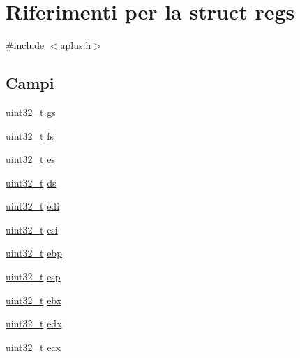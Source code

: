 \hypertarget{structregs}{\section{Riferimenti per la struct regs}
\label{structregs}
}


{\ttfamily \#include $<$aplus.\+h$>$}

\subsection*{Campi}
\begin{DoxyCompactItemize}
\item 
\hyperlink{aplus_8h_a53a0df51603c77c2aa5b9ea61b606a82}{uint32\+\_\+t} \hyperlink{structregs_a0fd3992a1d7ba82600e1e03bf5466ce8}{gs}
\item 
\hyperlink{aplus_8h_a53a0df51603c77c2aa5b9ea61b606a82}{uint32\+\_\+t} \hyperlink{structregs_a0974815767aa327833ce6beac16858d5}{fs}
\item 
\hyperlink{aplus_8h_a53a0df51603c77c2aa5b9ea61b606a82}{uint32\+\_\+t} \hyperlink{structregs_aede6adc8400a3e68071ad7a038fbbcc9}{es}
\item 
\hyperlink{aplus_8h_a53a0df51603c77c2aa5b9ea61b606a82}{uint32\+\_\+t} \hyperlink{structregs_aa29daa3553339a188913853a1d91e30a}{ds}
\item 
\hyperlink{aplus_8h_a53a0df51603c77c2aa5b9ea61b606a82}{uint32\+\_\+t} \hyperlink{structregs_a2b436d52440963797508f228cd45c207}{edi}
\item 
\hyperlink{aplus_8h_a53a0df51603c77c2aa5b9ea61b606a82}{uint32\+\_\+t} \hyperlink{structregs_a88723011f6b017490ee8bc7fc9a3235c}{esi}
\item 
\hyperlink{aplus_8h_a53a0df51603c77c2aa5b9ea61b606a82}{uint32\+\_\+t} \hyperlink{structregs_a1b38213d82714658dfd95ba5427f7f7b}{ebp}
\item 
\hyperlink{aplus_8h_a53a0df51603c77c2aa5b9ea61b606a82}{uint32\+\_\+t} \hyperlink{structregs_a7c44c0dc13f854e06e6cc509ba6e9054}{esp}
\item 
\hyperlink{aplus_8h_a53a0df51603c77c2aa5b9ea61b606a82}{uint32\+\_\+t} \hyperlink{structregs_a41a7a63387c4bb590af33d8ee3cb5a42}{ebx}
\item 
\hyperlink{aplus_8h_a53a0df51603c77c2aa5b9ea61b606a82}{uint32\+\_\+t} \hyperlink{structregs_a63133abf1974301855fe69ef4ee70ef3}{edx}
\item 
\hyperlink{aplus_8h_a53a0df51603c77c2aa5b9ea61b606a82}{uint32\+\_\+t} \hyperlink{structregs_a63c6a54e49cb7c0035440d0fda58a63b}{ecx}
\item 

\end{DoxyCompactItemize}
